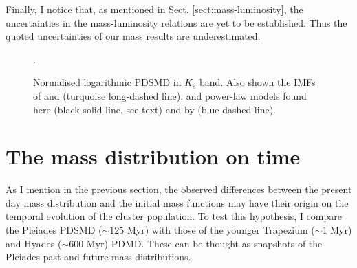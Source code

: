 Finally, I notice that, as mentioned in Sect. \ref{sect:mass-luminosity}, the uncertainties in the mass-luminosity relations are yet to be established. Thus the quoted uncertainties of our mass results are underestimated.

\begin{figure}[htbp]
\begin{center}
\caption{Normalised logarithmic PDSMD in $K_s$ band. Also shown the IMFs of \citet{Chabrier2005} \cite[blue dotted line with uncertainties from][]{Chabrier2003b} and  \citet{Thies2007} (turquoise long-dashed line), and power-law models found here (black solid line, see text) and by \citet{Bouy2015} (blue dashed line).}
\label{fig:ModelMassFunction}.
\end{center}
\end{figure}

\section{The mass distribution on time}
As I mention in the previous section, the observed differences between the present day mass distribution and the initial mass functions may have their origin on the temporal evolution of the cluster population. To test this hypothesis, I compare the Pleiades PDSMD ($\sim125$ Myr) with those of the younger Trapezium ($\sim1$ Myr) and Hyades ($\sim 600$ Myr) PDMD. These can be thought as snapshots of the Pleiades past and future mass distributions.

